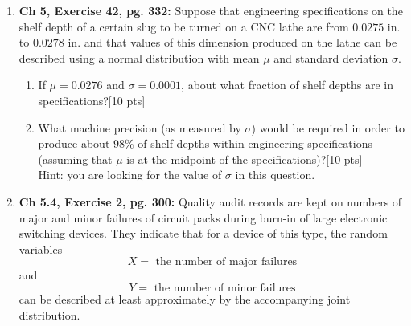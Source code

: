 \documentclass[11pt]{article}\usepackage[]{graphicx}\usepackage[]{color}
\begin{document}
\begin{enumerate}
    \item \textbf{Ch 5, Exercise 42, pg. 332:} Suppose that engineering specifications on the shelf depth of a certain slug to be turned on a CNC lathe are from $0.0275$ in. to $0.0278$ in. and that values of this dimension produced on the lathe can be described using a normal distribution with mean $\mu$ and standard deviation $\sigma$.
        \begin{enumerate}
              \item If $\mu = 0.0276$ and $\sigma = 0.0001$, about what fraction of shelf depths are in specifications?[10 pts]
              
              \item What machine precision (as measured by $\sigma$) would be required in order to produce about $98$\% of shelf depths within engineering specifications (assuming that $\mu$ is at the midpoint of the specifications)?[10 pts]\\
              Hint: you are looking for the value of $\sigma$ in this question.
        \end{enumerate}
 \item \textbf{Ch 5.4, Exercise 2, pg. 300:} Quality audit records are kept on numbers of major and minor failures of circuit packs during burn-in of large electronic switching devices. They indicate that for a device of this type, the random variables
    $$
    X = \text{ the number of major failures}
    $$
    and
    $$
    Y = \text{ the number of minor failures}
    $$
    can be described at least approximately by the accompanying joint distribution.




\end{enumerate}
\end{document}
